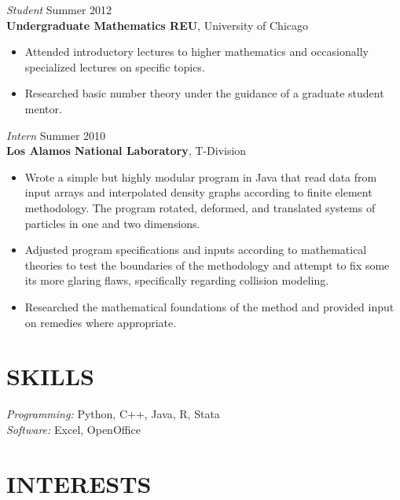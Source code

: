 \documentclass[margin, 10pt]{res} %
\begin{document}
\begin{resume}
{\sl Student} \hfill Summer 2012 \\
\textbf{Undergraduate Mathematics REU}, University of Chicago 
\begin{itemize} \itemsep -2pt
\item Attended introductory lectures to higher mathematics and occasionally specialized lectures on specific topics.
\item Researched basic number theory under the guidance of a graduate student mentor.  
\end{itemize} 

{\sl Intern} \hfill Summer 2010 \\
\textbf{Los Alamos National Laboratory}, T-Division
\begin{itemize} \itemsep -2pt
\item Wrote a simple but highly modular program in Java that read data from input arrays and interpolated density graphs according to finite element methodology. The program rotated, deformed, and translated systems of particles in one and two dimensions.
\item Adjusted program specifications and inputs according to mathematical theories to test the boundaries of the methodology and attempt to fix some its more glaring flaws, specifically regarding collision modeling. 
\item Researched the mathematical foundations of the method and provided input on remedies where appropriate. 
\end{itemize} 


\section{SKILLS} 

{\sl Programming:} 
Python, C++, Java, R, Stata \\
{\sl Software:} 
Excel, OpenOffice \\


\section{INTERESTS} 


\end{resume}
\end{document}
